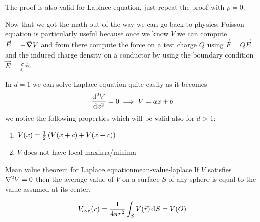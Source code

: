 \documentclass[12pt]{extarticle}
\begin{document}
\begin{corollary}{}{}
    The proof is also valid for Laplace equation, just repeat the proof with $\rho = 0$.
\end{corollary}

Now that we got the math out of the way we can go back to physics:
Poisson equation is particularly useful because once we know $V$ we can compute $\vec E = - \grad V$ and from there compute the force on a test charge $Q$ using $\vec F = Q \vec E$ and the induced charge density on a conductor by using the boundary condition $\vec E = \frac{\sigma}{\varepsilon_0} \hat n$.

In $d = 1$ we can solve Laplace equation quite easily as it becomes
\begin{equation}
    \dv[2]{V}{x} = 0 \implies V = ax + b
\end{equation}
we notice the following properties which will be valid also for $d \gt 1$:
\begin{enumerate}
    \item $V(x) = \frac{1}{2} \left( V(x +c) + V(x-c) \right)$
    \item $V$ does not have local maxima/minima
\end{enumerate}

\begin{theorem}{Mean value theorem for Laplace equation}{mean-value-laplace}
    If $V$ satisfies $\laplacian V = 0$ then the average value of $V$ on a surface $S$ of any sphere is equal to the value assumed at its center.

    \begin{equation}
        V_\text{avg} (r) = \frac{1}{4 \pi r^2} \int_S V(\vec r)\dd{S} = V(O)
    \end{equation}
\end{theorem}
\end{document}
